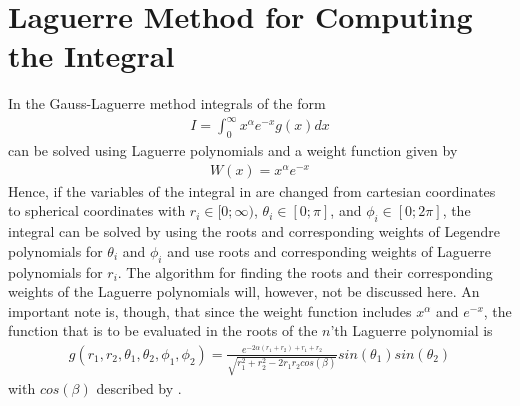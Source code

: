 \section{Laguerre Method for Computing the Integral}
\label{sec:LaguerreMethod}
In the Gauss-Laguerre method integrals of the form
\begin{align}
	I = \int _0 ^{\infty } x^{\alpha } e^{-x} g(x) dx
	\label{eq:LaguerreMethod1}
\end{align}
can be solved using Laguerre polynomials and a weight function given by
\begin{align}
	W(x) = x^{\alpha} e^{-x}
	\label{eq:LaguerreMethod2}
\end{align} 
Hence, if the variables of the integral in 
are changed from cartesian coordinates to spherical coordinates with 
$r_i \in [0;\infty )$, 
$\theta_i \in [0;\pi]$, and 
$\phi_i \in [0;2\pi]$, the integral can be solved by using the roots and corresponding weights of Legendre polynomials for $\theta_i$ and $\phi_i$ and use roots and corresponding weights of Laguerre polynomials for $r_i$.
The algorithm for finding the roots and their corresponding weights of the Laguerre polynomials will, however, not be discussed here.
An important note is, though, that since the weight function includes $x^{\alpha}$ and $e^{-x}$, the function that is to be evaluated in the roots of the $n$'th Laguerre polynomial is 
\begin{align}  
   g(r_1, r_2, \theta_1, \theta_2, \phi_1, \phi_2 ) = 
   \frac{e^{-2\alpha (r_1 + r_2 ) + r_1 + r_2}}{\sqrt{r_1^2 + r_2 ^2 -2 r_1 r_2 cos(\beta)}}  
sin(\theta_1 ) sin(\theta_2 )    
   \label{eq:LaguerreMethod3}
\end{align} 
with $cos(\beta)$ described by .
